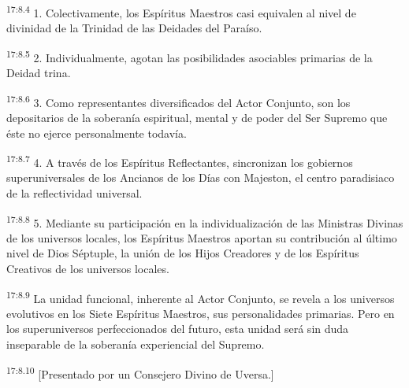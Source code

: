 \par
\textsuperscript{17:8.4} 1. Colectivamente, los Espíritus Maestros casi equivalen al nivel de divinidad de la Trinidad de las Deidades del Paraíso.

\par
\textsuperscript{17:8.5} 2. Individualmente, agotan las posibilidades asociables primarias de la Deidad trina.

\par
\textsuperscript{17:8.6} 3. Como representantes diversificados del Actor Conjunto, son los depositarios de la soberanía espiritual, mental y de poder del Ser Supremo que éste no ejerce personalmente todavía.

\par
\textsuperscript{17:8.7} 4. A través de los Espíritus Reflectantes, sincronizan los gobiernos superuniversales de los Ancianos de los Días con Majeston, el centro paradisiaco de la reflectividad universal.

\par
\textsuperscript{17:8.8} 5. Mediante su participación en la individualización de las Ministras Divinas de los universos locales, los Espíritus Maestros aportan su contribución al último nivel de Dios Séptuple, la unión de los Hijos Creadores y de los Espíritus Creativos de los universos locales.

\par
\textsuperscript{17:8.9} La unidad funcional, inherente al Actor Conjunto, se revela a los universos evolutivos en los Siete Espíritus Maestros, sus personalidades primarias. Pero en los superuniversos perfeccionados del futuro, esta unidad será sin duda inseparable de la soberanía experiencial del Supremo.

\par
\textsuperscript{17:8.10} [Presentado por un Consejero Divino de Uversa.]